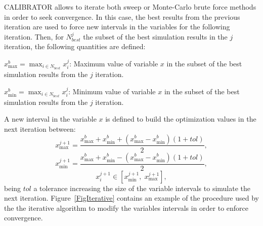\documentclass[review,authoryear]{elsarticle}
\newcommand{\EQ}[2]
{\begin{equation}#1\end{equation}\label{#2}}
\begin{document}
CALIBRATOR allows to iterate both sweep or Monte-Carlo brute force methods in order to
seek convergence. In this case, the best results from the previous
iteration are used to force new intervals in the variables for the following iteration. Then, for
$N_{best}^j$ the subset of the best simulation results in the $j$ iteration, the following quantities are 
defined:
\begin{description}
\item{$\displaystyle x_{\max}^b=\max_{i\in N_{best}}x_i^j$}: Maximum value of variable $x$ 
in the subset of the best simulation results from the $j$ iteration.
\item{$\displaystyle x_{\min}^b=\max_{i\in N_{best}}x_i^j$}: Minimum value of variable $x$ in the subset of the best simulation results from the $j$ iteration.
\end{description}
A new interval in the variable $x$ is defined to build the optimization values in the next iteration between:
\[
	x_{\max}^{j+1}=\frac{x_{\max}^b+x_{\min}^b
		+\left(x_{\max}^b-x_{\min}^b\right)(1+tol)}{2},
\]
\[
	x_{\min}^{j+1}=\frac{x_{\max}^b+x_{\min}^b
		-\left(x_{\max}^b-x_{\min}^b\right)(1+tol)}{2},
\]
\EQ{x_i^{j+1}\in\left[x_{\min}^{j+1},\;x_{\max}^{j+1}\right],}
{EqIterationInterval}
being $tol$ a tolerance increasing the size of the variable intervals to
simulate the next iteration.
Figure~\ref{FigIterative} contains an example of the procedure used by the the iterative algorithm to modify the variables intervals in order to enforce convergence. 
\end{document}
